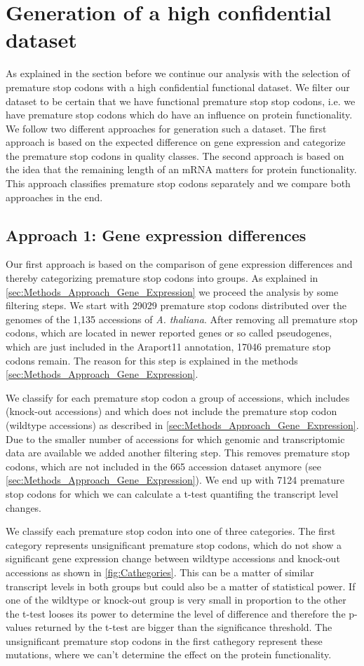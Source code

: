 \section{Generation of a high confidential dataset}
As explained in the section before we continue our analysis with the selection of premature stop codons with a high confidential functional dataset. We filter our dataset to be certain that we have functional premature stop stop codons, i.e. we have premature stop codons which do have an influence on protein functionality. We follow two different approaches for generation such a dataset. The first approach is based on the expected difference on gene expression and categorize the premature stop codons in quality classes. The second approach is based on the idea that the remaining length of an mRNA matters for protein functionality. This approach classifies premature stop codons separately and we compare both approaches in the end.  
\subsection{Approach 1: Gene expression differences}
Our first approach is based on the comparison of gene expression differences and thereby categorizing premature stop codons into groups. As explained in \autoref{sec:Methods_Approach_Gene_Expression} we proceed the analysis by some filtering steps. We start with 29029 premature stop codons distributed over the genomes of the 1,135 accessions of \textit{A. thaliana}. After removing all premature stop codons, which are located in newer reported genes or so called pseudogenes, which are just included in the Araport11 annotation, 17046 premature stop codons remain. The reason for this step is explained in the methods \autoref{sec:Methods_Approach_Gene_Expression}.

We classify for each premature stop codon a group of accessions, which includes (knock-out accessions) and which does not include the premature stop codon (wildtype accessions) as described in \autoref{sec:Methods_Approach_Gene_Expression}. Due to the smaller number of accessions for which genomic and transcriptomic data are available we added another filtering step. This removes premature stop codons, which are not included in the 665 accession dataset anymore (see \autoref{sec:Methods_Approach_Gene_Expression}). We end up with 7124 premature stop codons for which we can calculate a t-test quantifing the transcript level changes. 

We classify each premature stop codon into one of three categories. The first category represents unsignificant premature stop codons, which do not show a significant gene expression change between wildtype accessions and knock-out accessions as shown in \autoref{fig:Cathegories}. This can be a matter of similar transcript levels in both groups but could also be a matter of statistical power. If one of the wildtype or knock-out group is very small in proportion to the other the t-test looses its power to determine the level of difference and therefore the p-values returned by the t-test are bigger than the significance threshold. The unsignificant premature stop codons in the first cathegory represent these mutations, where we can't determine the effect on the protein functionality. 

